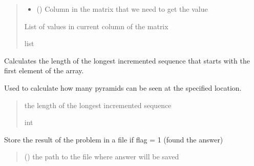 \documentclass[letterpaper,10pt,english]{sphinxmanual}
\begin{document}
\begin{fulllineitems}
\begin{fulllineitems}
\begin{quote}
\begin{description}
\begin{itemize}
\item {} 
\sphinxAtStartPar
{} () \textendash{} Column in the matrix that we need to get the value

\end{itemize}

\sphinxAtStartPar
List of values in current column of the matrix

\sphinxAtStartPar
list

\end{description}\end{quote}

\end{fulllineitems}


\begin{fulllineitems}
\label{\detokenize{board_resolver:board_resolver.BoardResolver.numVisiblePyramids}}
\pysigstartsignatures
{}
\pysigstopsignatures
\sphinxAtStartPar
Calculates the length of the longest incremented sequence
that starts with the first element of the array.

\sphinxAtStartPar
Used to calculate how many pyramids can be seen at the
specified location.
\begin{quote}\begin{description}
\sphinxAtStartPar
the length of the longest incremented sequence

\sphinxAtStartPar
int

\end{description}\end{quote}

\end{fulllineitems}


\begin{fulllineitems}
\label{\detokenize{board_resolver:board_resolver.BoardResolver.saveData}}
\pysigstartsignatures
{}
\pysigstopsignatures
\sphinxAtStartPar
Store the result of the problem in a file if flag = 1
(found the answer)
\begin{quote}\begin{description}
\sphinxAtStartPar
{} () \textendash{} the path to the file where answer will be saved


\end{description}
\end{quote}
\end{fulllineitems}
\end{fulllineitems}
\end{document}
